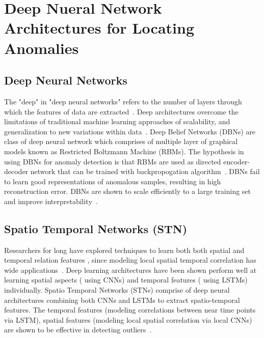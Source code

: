 \section{Deep Nueral Network Architectures for Locating Anomalies}
\label{sec:locatingAnomalieswithNNArchitecture}


\subsection{Deep Neural Networks}
\label{sec:dnn}
The "deep" in "deep neural networks" refers to the number of layers through which the features of data are extracted~\cite{schmidhuber2015deep,bengio2009learning}. Deep architectures overcome the limitations of traditional machine learning approaches of scalability, and generalization to new variations within data~\cite{lecun2015deep}. Deep Belief Networks (DBNs) are class of deep neural network which comprises of multiple layer of graphical models known as Restricted Boltzmann Machine (RBMs).
The hypothesis in using DBNs for anomaly detection is that RBMs are used as  directed encoder-decoder network that can be trained with backpropogation algorithm~\cite{werbos1990backpropagation}. DBNs fail to learn good representations of anomalous samples, resulting in high reconstruction error. DBNs  are shown to scale efficiently to a large training set and improve interpretability~\cite{wulsin2010semi}.


\subsection{\textbf{Spatio Temporal Networks (STN)}}
\label{sec:stn}
Researchers for long have explored  techniques to learn both both spatial and temporal relation features , since modeling local spatial temporal correlation has wide applications~\cite{zhang2018detecting}. Deep learning architectures have been shown perform well at learning spatial aspects ( using CNNs) and temporal features ( using LSTMs) individually. Spatio Temporal Networks (STNs) comprise of deep neural architectures combining both CNNs and LSTMs to extract spatio-temporal features. The temporal
features (modeling correlations between near time points via LSTM), spatial features (modeling
local spatial correlation via local CNNs) are shown to be effective in detecting outliers~\cite{lee2018stan,szeker2014spatio,nie2018spatio,dereszynski2011spatiotemporal}.

